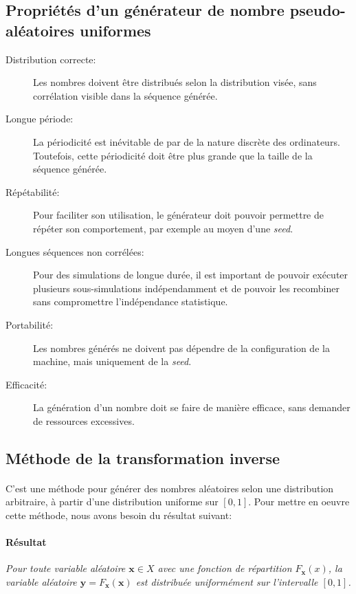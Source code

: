 \documentclass[a4paper]{article}
\begin{document}
\subsection{Propriétés d'un générateur de nombre pseudo-aléatoires uniformes}
\begin{description}
	\item[Distribution correcte:]Les nombres doivent être distribués
		selon la distribution visée, sans corrélation visible dans la
		séquence générée.
	\item[Longue période:] La périodicité est inévitable de par de la
		nature discrète des ordinateurs. Toutefois, cette périodicité
		doit être plus grande que la taille de la séquence générée.
	\item[Répétabilité:]Pour faciliter son utilisation, le générateur
		doit pouvoir permettre de répéter son comportement, par exemple
		au moyen d'une \emph{seed}.
	\item[Longues séquences non corrélées:]Pour des simulations de
		longue durée, il est important de pouvoir exécuter plusieurs
		sous-simulations indépendamment et de pouvoir les recombiner
		sans compromettre l'indépendance statistique.
	\item[Portabilité:]Les nombres générés ne doivent pas dépendre de la
		configuration de la machine, mais uniquement de la \emph{seed}.
	\item[Efficacité:]La génération d'un nombre doit se faire de manière
		efficace, sans demander de ressources excessives.
\end{description}
\subsection{Méthode de la transformation inverse}
\paragraph{}
C'est une méthode pour générer des nombres aléatoires
selon une distribution arbitraire, à partir d'une distribution uniforme
sur \([0,1]\). Pour mettre en oeuvre cette méthode, nous avons besoin du
résultat suivant:
\paragraph{Résultat}
\emph{Pour toute variable aléatoire \(\mathbf x\in X\) avec une fonction
de répartition \(F_{\mathbf x}(x)\), la variable aléatoire
\(\mathbf y=F_{\mathbf x}(\mathbf x)\) est distribuée uniformément sur
l'intervalle \([0,1]\).}
\end{document}
